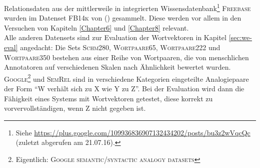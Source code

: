   \begin{table}[h]
    \centering
    \def\arraystretch{1.5}
  \caption[Übersicht über verwendete vorgefertigte Datensets]{Übersicht über in dieser Arbeit verwendete, extern generierte
  Datensets sowie deren Quelle.\label{fig:datasets}}
\end{table}

  Relationsdaten aus der mittlerweile in  integrierten Wissensdatenbank\footnote{Siehe
  \url{https://plus.google.com/109936836907132434202/posts/bu3z2wVqcQc} (zuletzt abgerufen am 21.07.16).}
   \textsc{Freebase} wurden im Datenset \textsc{FB14k} von (\cite{bordes2013translating}) gesammelt.
  Diese werden vor allem in den Versuchen von Kapiteln \ref{Chapter6} und \ref{Chapter8} relevant.\\

  Alle anderen Datensets sind zur Evaluation der Wortvektoren in Kapitel \ref{sec:we-eval} angedacht: Die Sets
  \textsc{Schm280}, \textsc{Wortpaare65}, \textsc{Wortpaare222} und \textsc{Wortpaare350} bestehen aus einer Reihe
  von Wortpaaren, die von menschlichen Annotatoren auf verschiedenen Skalen nach Ähnlichkeit bewertet wurden.\\
  \textsc{Google}\footnote{Eigentlich: \textsc{Google semantic/syntactic analogy datasets}} und \textsc{SemRel} sind
  in verschiedene Kategorien eingeteilte Analogiepaare der Form ``W verhält sich zu X wie Y zu Z''. Bei der Evaluation
  wird dann die Fähigkeit eines Systems mit Wortvektoren getestet, diese korrekt zu vorvervollständigen, wenn Z nicht
  gegeben ist.


